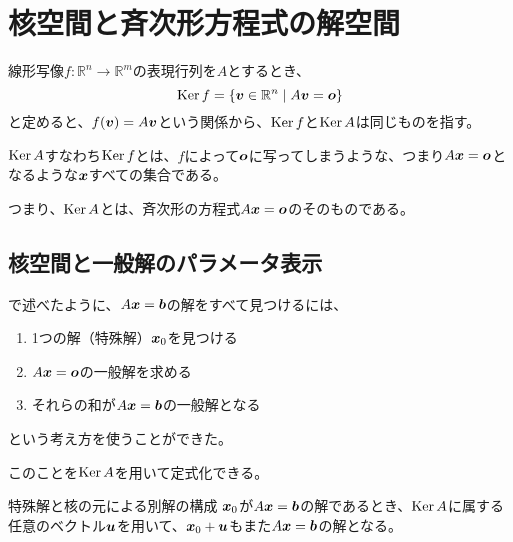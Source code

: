 \documentclass[../../../topic_linear-algebra]{subfiles}
\begin{document}
\sectionline
\section{核空間と斉次形方程式の解空間}

線形写像$f\colon \mathbb{R}^n \to \mathbb{R}^m$の表現行列を$A$とするとき、
\begin{equation*}
  \operatorname{Ker} f = \{ \vb*{v} \in \mathbb{R}^n \mid A\vb*{v} = \vb*{o} \}
\end{equation*}
と定めると、$f(\vb*{v}) = A\vb*{v}$という関係から、$\operatorname{Ker} f$と$\operatorname{Ker} A$は同じものを指す。

\br

$\operatorname{Ker} A$すなわち$\operatorname{Ker} f$とは、$f$によって$\vb*{o}$に写ってしまうような、つまり$A\vb*{x}=\vb*{o}$となるような$\vb*{x}$すべての集合である。

\br

つまり、$\operatorname{Ker} A$とは、斉次形の方程式$A\vb*{x} = \vb*{o}$のそのものである。

\subsection{核空間と一般解のパラメータ表示}

で述べたように、$A\vb*{x} = \vb*{b}$の解をすべて見つけるには、
\begin{enumerate}
  \item 1つの解（特殊解）$\vb*{x}_0$を見つける
  \item $A\vb*{x} = \vb*{o}$の一般解を求める
  \item それらの和が$A\vb*{x} = \vb*{b}$の一般解となる
\end{enumerate}
という考え方を使うことができた。

\br

このことを$\operatorname{Ker} A$を用いて定式化できる。

\begin{theorem*}{特殊解と核の元による別解の構成}
  $\vb*{x}_0$が$A\vb*{x} = \vb*{b}$の解であるとき、$\operatorname{Ker} A$に属する任意のベクトル$\vb*{u}$を用いて、$\vb*{x}_0 + \vb*{u}$もまた$A\vb*{x} = \vb*{b}$の解となる。
\end{theorem*}
\end{document}

